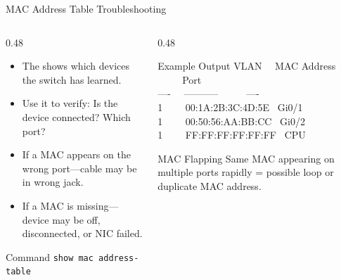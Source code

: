\documentclass[aspectratio=169]{beamer}  %
\begin{document}
\begin{frame}{MAC Address Table Troubleshooting}
    \begin{columns}[T]
        \begin{column}{0.48\textwidth}
            \begin{itemize}
                \item The  shows which devices the switch has learned.
                \item Use it to verify: Is the device connected? Which port?
                \item If a MAC appears on the wrong port---cable may be in wrong jack.
                \item If a MAC is missing---device may be off, disconnected, or NIC failed.
            \end{itemize}
            
            \vspace{0.3em}
            \begin{block}{Command}
                \texttt{show mac address-table}
            \end{block}
        \end{column}
        \begin{column}{0.48\textwidth}
            \begin{block}{Example Output}
                \ttfamily\scriptsize
                VLAN \ \ MAC Address \ \ \ \ \ Port \\
                ---- \ \ ----------- \ \ \ \ \ ---- \\
                1 \ \ \ \ 00:1A:2B:3C:4D:5E \ Gi0/1 \\
                1 \ \ \ \ 00:50:56:AA:BB:CC \ Gi0/2 \\
                1 \ \ \ \ FF:FF:FF:FF:FF:FF \ CPU
            \end{block}
            
            \vspace{0.3em}
            \begin{alertblock}{MAC Flapping}
                Same MAC appearing on multiple ports rapidly = possible loop or duplicate MAC address.
            \end{alertblock}
        \end{column}
    \end{columns}
\end{frame}
\end{document}
